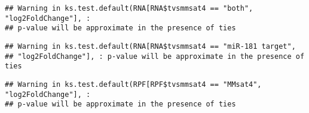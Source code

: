 \documentclass[
]{article}
\newenvironment{Shaded}{\begin{snugshade}}{\end{snugshade}}
\newcommand{\FunctionTok}[1]{\textcolor[rgb]{0.13,0.29,0.53}{\textbf{#1}}}
\newcommand{\NormalTok}[1]{#1}
\newcommand{\OtherTok}[1]{\textcolor[rgb]{0.56,0.35,0.01}{#1}}
\newcommand{\SpecialCharTok}[1]{\textcolor[rgb]{0.81,0.36,0.00}{\textbf{#1}}}
\newcommand{\StringTok}[1]{\textcolor[rgb]{0.31,0.60,0.02}{#1}}
\begin{document}
\begin{verbatim}
## Warning in ks.test.default(RNA[RNA$tvsmmsat4 == "both", "log2FoldChange"], :
## p-value will be approximate in the presence of ties
\end{verbatim}

\begin{Shaded}
\end{Shaded}

\begin{verbatim}
## Warning in ks.test.default(RNA[RNA$tvsmmsat4 == "miR-181 target",
## "log2FoldChange"], : p-value will be approximate in the presence of ties
\end{verbatim}

\begin{Shaded}
\end{Shaded}

\begin{verbatim}
## Warning in ks.test.default(RPF[RPF$tvsmmsat4 == "MMsat4", "log2FoldChange"], :
## p-value will be approximate in the presence of ties
\end{verbatim}

\begin{Shaded}
\end{Shaded}
\end{document}

